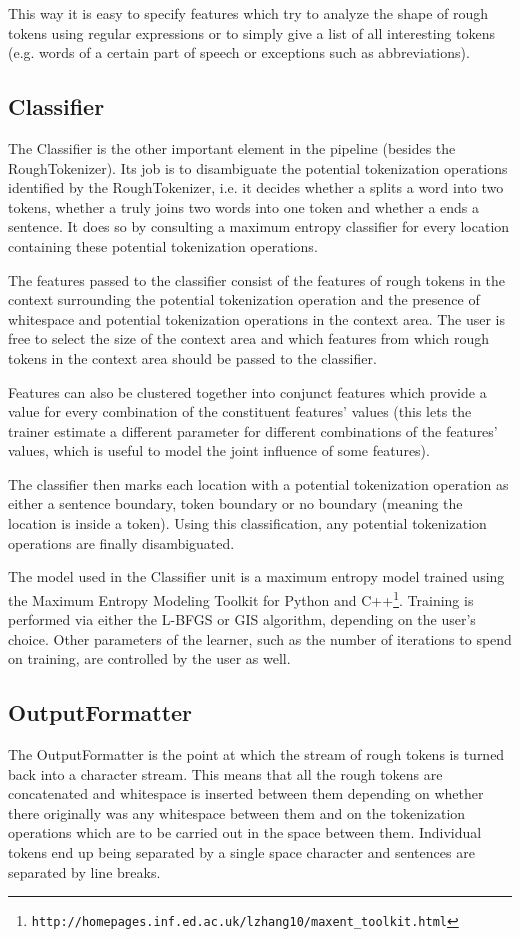 This way it is easy to specify features which try to analyze the shape
of rough tokens using regular expressions or to simply give a list of
all interesting tokens (e.g. words of a certain part of speech or
exceptions such as abbreviations).

\subsection{Classifier}

The Classifier is the other important element in the pipeline (besides
the RoughTokenizer). Its job is to disambiguate the potential
tokenization operations identified by the RoughTokenizer, i.e. it
decides whether a \maysplit{} splits a word into two tokens, whether a
\mayjoin{} truly joins two words into one token and whether a
\maybreaksentence{} ends a sentence. It does so by consulting a
maximum entropy classifier for every location containing these
potential tokenization operations.

The features passed to the classifier consist of the features of rough
tokens in the context surrounding the potential tokenization operation
and the presence of whitespace and potential tokenization operations
in the context area. The user is free to select the size of the
context area and which features from which rough tokens in the context
area should be passed to the classifier.

Features can also be clustered together into conjunct features which
provide a value for every combination of the constituent features'
values (this lets the trainer estimate a different parameter for
different combinations of the features' values, which is useful to
model the joint influence of some features).

The classifier then marks each location with a potential tokenization
operation as either a sentence boundary, token boundary or no boundary
(meaning the location is inside a token). Using this classification,
any potential tokenization operations are finally disambiguated.

The model used in the Classifier unit is a maximum entropy model
trained using the Maximum Entropy Modeling Toolkit for Python and
C++\footnote{\texttt{http://homepages.inf.ed.ac.uk/lzhang10/maxent\_toolkit.html}}.
Training is performed via either the L-BFGS or GIS algorithm,
depending on the user's choice. Other parameters of the learner, such
as the number of iterations to spend on training, are controlled by
the user as well.

\subsection{OutputFormatter}

The OutputFormatter is the point at which the stream of rough tokens
is turned back into a character stream. This means that all the rough
tokens are concatenated and whitespace is inserted between them
depending on whether there originally was any whitespace between them
and on the tokenization operations which are to be carried out in the
space between them. Individual tokens end up being separated by a
single space character and sentences are separated by line breaks.
